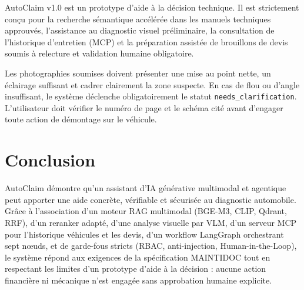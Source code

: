 \documentclass[11pt,a4paper]{article}
\begin{document}
AutoClaim v1.0 est un prototype d'aide à la décision technique. Il est strictement conçu pour la recherche sémantique accélérée dans les manuels techniques approuvés, l'assistance au diagnostic visuel préliminaire, la consultation de l'historique d'entretien (MCP) et la préparation assistée de brouillons de devis soumis à relecture et validation humaine obligatoire.

Les photographies soumises doivent présenter une mise au point nette, un éclairage suffisant et cadrer clairement la zone suspecte. En cas de flou ou d'angle insuffisant, le système déclenche obligatoirement le statut \texttt{needs\_clarification}. L'utilisateur doit vérifier le numéro de page et le schéma cité avant d'engager toute action de démontage sur le véhicule.

\section{Conclusion}

AutoClaim démontre qu'un assistant d'IA générative multimodal et agentique peut apporter une aide concrète, vérifiable et sécurisée au diagnostic automobile. Grâce à l'association d'un moteur RAG multimodal (BGE-M3, CLIP, Qdrant, RRF), d'un reranker adapté, d'une analyse visuelle par VLM, d'un serveur MCP pour l'historique véhicules et les devis, d'un workflow LangGraph orchestrant sept nœuds, et de garde-fous stricts (RBAC, anti-injection, Human-in-the-Loop), le système répond aux exigences de la spécification MAINTIDOC tout en respectant les limites d'un prototype d'aide à la décision : aucune action financière ni mécanique n'est engagée sans approbation humaine explicite.
\end{document}
